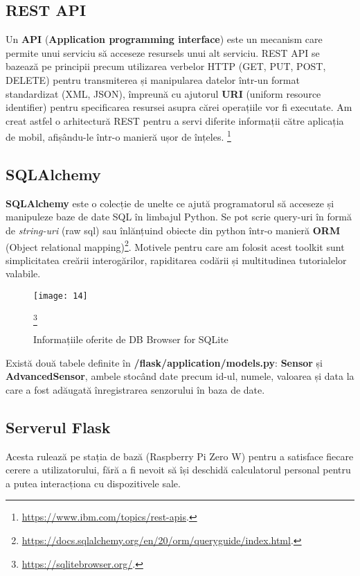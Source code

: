 \subsection{REST API}

Un \textbf{API} (\textbf{Application programming interface}) este un mecanism care permite unui serviciu să acceseze resursels unui alt serviciu. REST API se bazează pe principii precum utilizarea verbelor HTTP (GET, PUT, POST, DELETE) pentru transmiterea și manipularea datelor într-un format standardizat (XML, JSON), împreună cu ajutorul \textbf{URI} (uniform resource identifier) pentru specificarea resursei asupra cărei operațiile vor fi executate. Am creat astfel o arhitectură REST pentru a servi diferite informații către aplicația de mobil, afișându-le într-o manieră ușor de înțeles. \footnote{\url{https://www.ibm.com/topics/rest-apis}.}

\subsection{SQLAlchemy}

\textbf{SQLAlchemy} este o colecție de unelte ce ajută programatorul să acceseze și manipuleze baze de date SQL în limbajul Python. Se pot scrie query-uri în formă de \emph{string-uri} (raw sql) sau înlănțuind obiecte din python într-o manieră \textbf{ORM} (Object relational mapping)\footnote{\url{https://docs.sqlalchemy.org/en/20/orm/queryguide/index.html}.}. Motivele pentru care am folosit acest toolkit sunt simplicitatea creării interogărilor, rapiditarea codării și multitudinea tutorialelor valabile.

\begin{figure}[h]
	\centering
	\texttt{[image: 14]}
	\caption{Informațiile oferite de DB Browser for SQLite} \footnote{\url{https://sqlitebrowser.org/}.}
	\label{fig:14}
\end{figure}

Există două tabele definite în \textbf{/flask/application/models.py}: \textbf{Sensor} și \textbf{AdvancedSensor}, ambele stocând date precum id-ul, numele, valoarea și data la care a fost adăugată înregistrarea senzorului în baza de date.

\subsection{Serverul Flask}

Acesta rulează pe stația de bază (Raspberry Pi Zero W) pentru a satisface fiecare cerere a utilizatorului, fără a fi nevoit să își deschidă calculatorul personal pentru a putea interacționa cu dispozitivele sale. 

